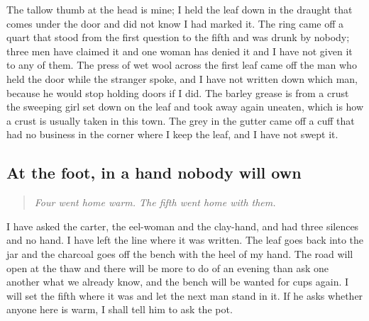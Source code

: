 \documentclass{design/chronicle}
\begin{document}
The tallow thumb at the head is mine; I held the leaf down in the draught that comes under the door and did not know I had marked it. The ring came off a quart that stood from the first question to the fifth and was drunk by nobody; three men have claimed it and one woman has denied it and I have not given it to any of them. The press of wet wool across the first leaf came off the man who held the door while the stranger spoke, and I have not written down which man, because he would stop holding doors if I did. The barley grease is from a crust the sweeping girl set down on the leaf and took away again uneaten, which is how a crust is usually taken in this town. The grey in the gutter came off a cuff that had no business in the corner where I keep the leaf, and I have not swept it.

\subsection*{At the foot, in a hand nobody will own}

\begin{quote}\itshape Four went home warm. The fifth went home with them.\end{quote}

I have asked the carter, the eel-woman and the clay-hand, and had three silences and no hand. I have left the line where it was written. The leaf goes back into the jar and the charcoal goes off the bench with the heel of my hand. The road will open at the thaw and there will be more to do of an evening than ask one another what we already know, and the bench will be wanted for cups again. I will set the fifth where it was and let the next man stand in it. If he asks whether anyone here is warm, I shall tell him to ask the pot.
\end{document}
